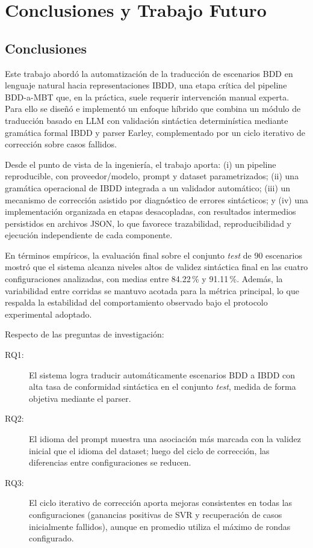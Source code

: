 \chapter{Conclusiones y Trabajo Futuro}

\section{Conclusiones}

Este trabajo abordó la automatización de la traducción de escenarios BDD en lenguaje natural hacia representaciones IBDD, una etapa crítica del pipeline BDD-a-MBT que, en la práctica, suele requerir intervención manual experta. Para ello se diseñó e implementó un enfoque híbrido que combina un módulo de traducción basado en LLM con validación sintáctica determinística mediante gramática formal IBDD y parser Earley, complementado por un ciclo iterativo de corrección sobre casos fallidos.

Desde el punto de vista de la ingeniería, el trabajo aporta: (i) un pipeline reproducible, con proveedor/modelo, prompt y dataset parametrizados; (ii) una gramática operacional de IBDD integrada a un validador automático; (iii) un mecanismo de corrección asistido por diagnóstico de errores sintácticos; y (iv) una implementación organizada en etapas desacopladas, con resultados intermedios persistidos en archivos JSON, lo que favorece trazabilidad, reproducibilidad y ejecución independiente de cada componente.

En términos empíricos, la evaluación final sobre el conjunto \textit{test} de 90 escenarios mostró que el sistema alcanza niveles altos de validez sintáctica final en las cuatro configuraciones analizadas, con medias entre 84.22\,\% y 91.11\,\%. Además, la variabilidad entre corridas se mantuvo acotada para la métrica principal, lo que respalda la estabilidad del comportamiento observado bajo el protocolo experimental adoptado.

Respecto de las preguntas de investigación:

\begin{description}
  \item[RQ1:] El sistema logra traducir automáticamente escenarios BDD a IBDD con alta tasa de conformidad sintáctica en el conjunto \textit{test}, medida de forma objetiva mediante el parser.
  \item[RQ2:] El idioma del prompt muestra una asociación más marcada con la validez inicial que el idioma del dataset; luego del ciclo de corrección, las diferencias entre configuraciones se reducen.
  \item[RQ3:] El ciclo iterativo de corrección aporta mejoras consistentes en todas las configuraciones (ganancias positivas de SVR y recuperación de casos inicialmente fallidos), aunque en promedio utiliza el máximo de rondas configurado.
\end{description}

